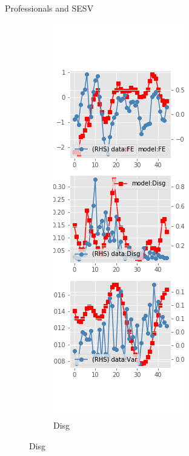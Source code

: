 \documentclass{beamer}
\begin{document}
\begin{frame}{Professionals and SESV}
\begin{figure}[ht]
\begin{subfigure}[b]{0.2\textwidth}
		\end{subfigure}
		\hfill
		\begin{subfigure}[b]{0.2\textwidth}
			\caption{Disg}
			\includegraphics[width=\textwidth, height = 0.8\textheight]{figuresDraft/spf_se_est_sv_diag1.png}

\end{subfigure}
\end{figure}
\end{frame}
\end{document}
